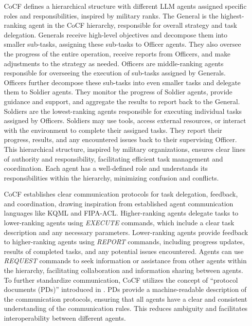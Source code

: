 CoCF defines a hierarchical structure with different LLM agents assigned
specific roles and responsibilities, inspired by military ranks. The General is
the highest-ranking agent in the CoCF hierarchy, responsible for overall strategy
and task delegation. Generals receive high-level objectives and decompose them
into smaller sub-tasks, assigning these sub-tasks to Officer agents. They also
oversee the progress of the entire operation, receive reports from Officers, and
make adjustments to the strategy as needed. Officers are middle-ranking agents responsible
for overseeing the execution of sub-tasks assigned by Generals. Officers further
decompose these sub-tasks into even smaller tasks and delegate them to Soldier
agents. They monitor the progress of Soldier agents, provide guidance and
support, and aggregate the results to report back to the General. Soldiers are
the lowest-ranking agents responsible for executing individual tasks assigned by
Officers. Soldiers may use tools, access external resources, or interact with the
environment to complete their assigned tasks. They report their progress, results,
and any encountered issues back to their supervising Officer. This hierarchical structure,
inspired by military organizations, ensures clear lines of authority and responsibility,
facilitating efficient task management and coordination. Each agent has a well-defined
role and understands its responsibilities within the hierarchy, minimizing
confusion and conflicts.

CoCF establishes clear communication protocols for task delegation, feedback,
and coordination, drawing inspiration from established agent communication languages
like KQML and FIPA-ACL. Higher-ranking agents delegate tasks to lower-ranking
agents using \textit{EXECUTE} commands, which include a clear task description
and any necessary parameters. Lower-ranking agents provide feedback to higher-ranking
agents using \textit{REPORT} commands, including progress updates, results of
completed tasks, and any potential issues encountered. Agents can use \textit{REQUEST}
commands to seek information or assistance from other agents within the hierarchy,
facilitating collaboration and information sharing between agents. To further standardize
communication, CoCF utilizes the concept of ``protocol documents (PDs)''
introduced in \cite{marro2024scalablecommunicationprotocolnetworks}. PDs provide
a machine-readable description of the communication protocols, ensuring that all
agents have a clear and consistent understanding of the communication rules. This
reduces ambiguity and facilitates interoperability between different agents.

